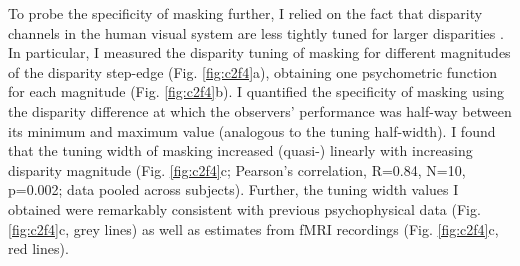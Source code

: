 To probe the specificity of masking further, I relied on the fact that disparity channels in the human visual system are less tightly tuned for larger disparities \cite{TYLER:1975fu,Badcock:1985ly,Lehky:1990fk,Stevenson:1992kx}. In particular, I measured the disparity tuning of masking for different magnitudes of the disparity step-edge (Fig. \ref{fig:c2f4}a), obtaining one psychometric function for each magnitude (Fig. \ref{fig:c2f4}b). I quantified the specificity of masking using the disparity difference at which the observers' performance was half-way between its minimum and maximum value (analogous to the tuning half-width). I found that the tuning width of masking increased (quasi-) linearly with increasing disparity magnitude (Fig. \ref{fig:c2f4}c; Pearson's correlation, R=0.84, N=10, p=0.002; data pooled across subjects). Further, the tuning width values I obtained were remarkably consistent with previous psychophysical data \cite{Stevenson:1992kx} (Fig. \ref{fig:c2f4}c, grey lines) as well as estimates from fMRI recordings \cite{Goncalves:2015aa} (Fig. \ref{fig:c2f4}c, red lines). 


